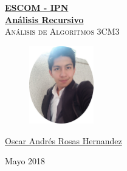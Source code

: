 \documentclass[12pt, fleqn]{article}                            %
\author{Oscar Andrés Rosas}                                     %
\theoremstyle{break}                                            %
\begin{document}
\begin{titlepage}
    
    \pagecolor{TitlePageColor}                                      %
    \color{white}                                                   %

    \vspace                                                         %
    \baselineskip                                                   %

    \makebox[0pt][l]{\rule{1.3\textwidth}{3pt}}                     %
    
    \href{https://compilandoconocimiento.com/}                      %
    {\textbf{\textsc{\Huge ESCOM - IPN}}}\\[2.7cm]                  %

    \href{https://github.com/CompilandoConocimiento/}               %
    {\fontsize{50}{65}\selectfont 
        \textbf{Análisis Recursivo}}\\[0.5cm]                       %
    \textcolor{ColorSubtext}
        {\textsc{\Huge Análisis de Algoritmos 3CM3}}\\[2cm]         %
    
    \vfill                                                          %

    \begin{figure}[h]
        \includegraphics[width=0.25\textwidth]{Photo}
    \end{figure}
    
    \href{ProjectAuthorLink}                                        %
    {\LARGE \textsf{Oscar Andrés Rosas Hernandez}}                  %

    \vspace                                                         %
    \baselineskip                                                   %
    
    {\large \textsf{Mayo 2018}}                                     %

\end{titlepage}
\end{document}
